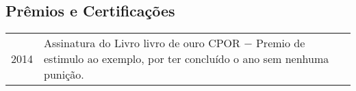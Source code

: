 \documentclass[a4paper, oneside, final]{scrartcl}
\begin{document}
\begin{center}
\section{Prêmios e Certificações}

\begin{tabularx}{0.97\linewidth}{p{2cm}X}
2014        & Assinatura do Livro livro de ouro CPOR $-$ Premio de estimulo ao exemplo, por ter concluído o ano sem nenhuma punição.
\end{tabularx}



\end{center}
\end{document}
